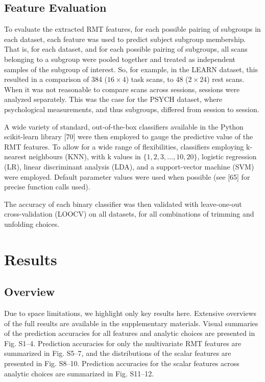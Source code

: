 \subsection{Feature Evaluation}
To evaluate the extracted RMT features, for each possible pairing of subgroups in each dataset, each
feature was used to predict subject subgroup membership. That is, for each dataset, and for each
possible pairing of subgroups, all scans belonging to a subgroup were pooled together and treated as
independent samples of the subgroup of interest. So, for example, in the LEARN dataset, this
resulted in a comparison of 384 (\(16 \times 4\)) task scans, to 48 (\(2 \times 24\)) rest scans. When it was not
reasonable to compare scans across sessions, sessions were analyzed separately. This was the case
for the PSYCH dataset, where psychological measurements, and thus subgroups, differed from session
to session.

A wide variety of standard, out-of-the-box classifiers available in the Python scikit-learn library
[70] were then employed to gauge the predictive value of the RMT features. To allow for a wide range
of flexibilities, classifiers employing k-nearest neighbours (KNN), with k values in \(\{1, 2, 3,
\dots, 10, 20\}\), logistic regression (LR), linear discriminant analysis (LDA), and a
support-vector machine (SVM) were employed. Default parameter values were used when possible (see
[65] for precise function calls used).

The accuracy of each binary classifier was then validated with leave-one-out cross-validation
(LOOCV) on all datasets, for all combinations of trimming and unfolding choices.

\section{Results}

\subsection{Overview}
Due to space limitations, we highlight only key results here. Extensive overviews of the full
results are available in the supplementary materials. Visual summaries of the prediction accuracies
for all features and analytic choices are presented in Fig. S1--4. Prediction accuracies for only the
multivariate RMT features are summarized in Fig. S5--7, and the distributions of the scalar features
are presented in Fig. S8--10. Prediction accuracies for the scalar features across analytic choices
are summarized in Fig. S11--12.

